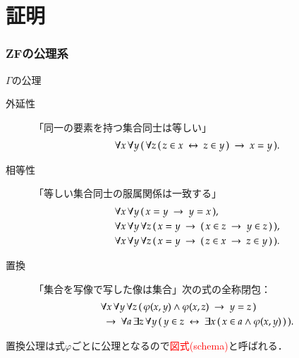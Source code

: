 \documentclass[dvipdfmx,10pt,notheorems]{beamer}
\theoremstyle{definition}
\newcommand{\lang}[1]{\mathcal{L}_{\scalebox{1.2}{$#1$}}} %
\newcommand{\rarrow}{\hspace{0.25em}\rightarrow\hspace{0.25em}} %
\newcommand{\lrarrow}{\hspace{0.25em}\leftrightarrow\hspace{0.25em}} %
\begin{document}
\section{証明}
%	

\begin{frame}\frametitle{{\bf ZF}の公理系}
	\begin{alertblock}{$\Gamma$の公理}
		\begin{description}
			\item[外延性] 「同一の要素を持つ集合同士は等しい」
				\begin{align}
					\forall x\, \forall y\, (\, \forall z\, (\, z \in x \lrarrow z \in y\, ) \rarrow x = y\, ).
				\end{align}
			\item[相等性] 「等しい集合同士の服属関係は一致する」
				\begin{align}
					&\forall x\, \forall y\, (\, x = y \rarrow y = x\, ), \\
					&\forall x\, \forall y\, \forall z\, 
					(\, x = y \rarrow (\, x \in z \rarrow y \in z\, )\, ), \\
					&\forall x\, \forall y\, \forall z\, 
					(\, x = y \rarrow (\, z \in x \rarrow z \in y\, )\, ).
				\end{align}
			\item[置換] 「集合を写像で写した像は集合」次の式の全称閉包： 
				\begin{align}
					&\forall x\, \forall y\, \forall z\, 
					(\, \varphi(x,y) \wedge \varphi(x,z) \rarrow y = z\, ) \\
					&\rarrow \forall a\, \exists z\, \forall y\,
					(\, y \in z \lrarrow \exists x\, (\, x \in a \wedge \varphi(x,y)\, )\, ).
				\end{align}
		\end{description}	
	\end{alertblock}
	置換公理は式$\varphi$ごとに公理となるので\textcolor{red}{図式(schema)}と呼ばれる．
\end{frame}
\end{document}
